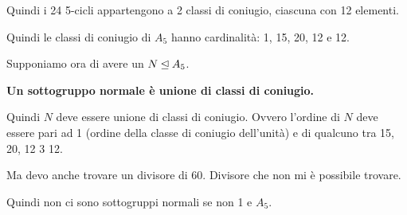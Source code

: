 \begin{dimostrazione}
	Quindi i 24 5-cicli appartengono a 2 classi di coniugio, ciascuna con 12 elementi.

	Quindi le classi di coniugio di $A_5$ hanno cardinalità: 1, 15, 20, 12 e 12.

	Supponiamo ora di avere un $N \unlhd A_5$.

	\textbf{Un sottogruppo normale è unione di classi di coniugio.}

	Quindi $N$ deve essere unione di classi di coniugio.
	Ovvero l'ordine di $N$ deve essere pari ad 1 (ordine della
	classe di coniugio dell'unità) e di qualcuno tra 15, 20, 12 3 12.

	Ma devo anche trovare un divisore di 60.
	Divisore che non mi è possibile trovare.

	Quindi non ci sono sottogruppi normali se non 1 e $A_5$.
\end{dimostrazione}

